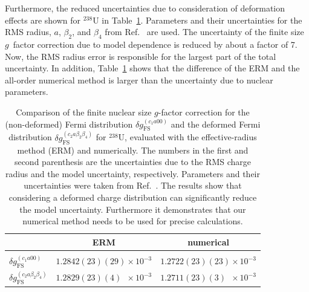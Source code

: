 Furthermore, the reduced uncertainties due to consideration of deformation effects are shown for $^{238}$U in Table~\ref{tab:uranium}. Parameters and their uncertainties for the RMS radius, $a$, $\beta_2$, and $\beta_4$ from Ref.~\cite{kozhedub2008} are used. The uncertainty of the finite size $g$~factor correction due to model dependence is reduced by about a factor of 7. Now, the RMS radius error is responsible for the largest part of the total uncertainty.  
In addition, Table~\ref{tab:uranium} shows that the difference of the ERM and the all-order numerical method is larger than the uncertainty due to nuclear parameters.
%
\begin{table}[t]
\caption{\label{tab:uranium}%
Comparison of the finite nuclear size $g$-factor correction for the (non-deformed) Fermi distribution $\delta g_{\text{FS}}^{(c_1a00)}$ and the deformed Fermi distribution $\delta g^{(c_2 a \beta_2\beta_4)}_{\text{FS}}$ for $^{238}$U, evaluated with the effective-radius method (ERM) and numerically. The numbers in the first and second parenthesis are the uncertainties due to the RMS charge radius and the model uncertainty, respectively. Parameters and their uncertainties were taken from Ref.~\cite{jacek2012}. The results show that considering a deformed charge distribution can significantly reduce the model uncertainty. Furthermore it demonstrates that our numerical method needs to be used for precise calculations. 
}
\centering
\begin{tabular}{l|cc}
&ERM&numerical\\\hline\\
$\delta g_{\text{FS}}^{(c_1a00)}$&$1.2842(23)(29)\times 10^{-3}$&$1.2722(23)(23)\times 10^{-3}$\\[0.4cm]
$\delta g^{(c_2a\beta_2\beta_4)}_{\text{FS}}$&$1.2829(23)(4)\phantom{0}\times 10^{-3}$&$1.2711(23)(3)\phantom{0}\times 10^{-3}$
\end{tabular}
\end{table}
%
